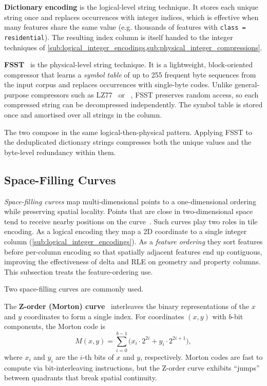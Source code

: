 \textbf{Dictionary encoding} is the logical-level string technique.
It stores each unique string once and replaces occurrences with integer indices, which is effective when many features share the same value (e.g. thousands of features with \texttt{class = \texttt{residential}}).
The resulting index column is itself handed to the integer techniques of \cref{sub:logical_integer_encodings,sub:physical_integer_compressions}.

\textbf{\acf{FSST}}~\cite{bonczFSSTFastRandom2020} is the physical-level string technique.
It is a lightweight, block-oriented compressor that learns a \emph{symbol table} of up to 255 frequent byte sequences from the input corpus and replaces occurrences with single-byte codes.
Unlike general-purpose compressors such as LZ77~\cite{zivUniversalAlgorithmSequential1977a} or ~\cite{colletZstandardCompressionApplication2021}, \ac{FSST} preserves random access, so each compressed string can be decompressed independently.
The symbol table is stored once and amortised over all strings in the column.

The two compose in the same logical-then-physical pattern.
Applying \ac{FSST} to the deduplicated dictionary strings compresses both the unique values and the byte-level redundancy within them.

\subsection{Space-Filling Curves}\label{sub:space_filling_curves}

\emph{Space-filling curves} map multi-dimensional points to a one-dimensional ordering while preserving spatial locality.
Points that are close in two-dimensional space tend to receive nearby positions on the curve~\cite{moonAnalysisClusteringProperties2001}.
Such curves play two roles in tile encoding.
As a logical encoding they map a 2D coordinate to a single integer column (\cref{sub:logical_integer_encodings}).
As a \emph{feature ordering} they sort features before per-column encoding so that spatially adjacent features end up contiguous, improving the effectiveness of delta and \ac{RLE} on geometry and property columns.
This subsection treats the feature-ordering use.

Two space-filling curves are commonly used.

The \textbf{Z-order (Morton) curve}~\cite{morton1966computer} interleaves the binary representations of the $x$ and $y$ coordinates to form a single index.
For coordinates $(x, y)$ with $b$-bit components, the Morton code is
\begin{equation}\label{eq:morton}
    M(x, y) = \sum_{i=0}^{b-1} \bigl( x_i \cdot 2^{2i} + y_i \cdot 2^{2i+1} \bigr),
\end{equation}
where $x_i$ and $y_i$ are the $i$-th bits of $x$ and $y$, respectively.
Morton codes are fast to compute via bit-interleaving instructions, but the Z-order curve exhibits \enquote{jumps} between quadrants that break spatial continuity.

